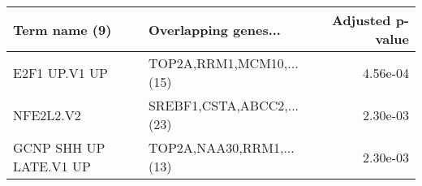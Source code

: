 \begin{tabular}{llr}
\toprule
         Term name (9) &      Overlapping genes... &  Adjusted p-value \\
\midrule
         E2F1 UP.V1 UP &  TOP2A,RRM1,MCM10,...(15) &          4.56e-04 \\
             NFE2L2.V2 & SREBF1,CSTA,ABCC2,...(23) &          2.30e-03 \\
GCNP SHH UP LATE.V1 UP &  TOP2A,NAA30,RRM1,...(13) &          2.30e-03 \\
\bottomrule
\end{tabular}
